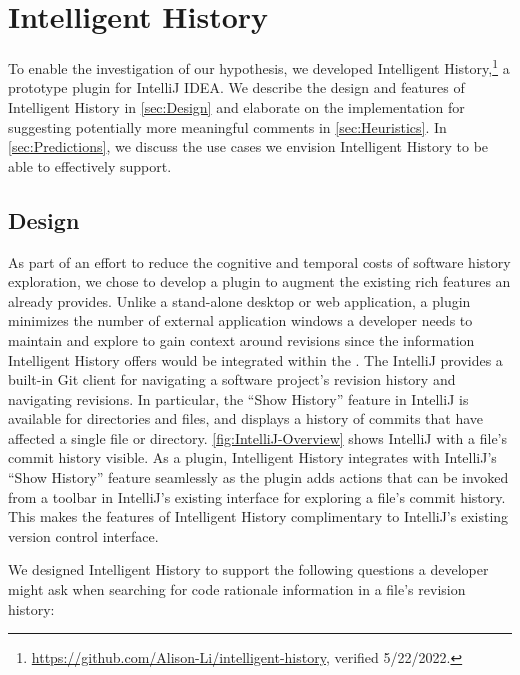 \chapter{Intelligent History}
\label{ch:Intelligent-History}

To enable the investigation of our hypothesis, we developed Intelligent History,\footnote{\url{https://github.com/Alison-Li/intelligent-history}, verified 5/22/2022.} a prototype plugin for IntelliJ IDEA.
We describe the design and features of Intelligent History in \autoref{sec:Design} and elaborate on the implementation
for suggesting potentially more meaningful comments in \autoref{sec:Heuristics}.
In \autoref{sec:Predictions}, we discuss the use cases we envision Intelligent History to be able to effectively support.

\section{Design}
\label{sec:Design}

As part of an effort to reduce the cognitive and temporal costs of software history exploration, we chose to develop a plugin to augment the existing rich features an  already provides.
Unlike a stand-alone desktop or web application, a plugin minimizes the number of external application windows a developer needs to maintain and explore to gain context around revisions since the information Intelligent History offers would be integrated within the .
The IntelliJ  provides a built-in Git client  for navigating a software project's revision history and navigating revisions. 
In particular, the ``Show History'' feature in IntelliJ is available for directories and files, and displays a history of commits that have affected a single file or directory.
\autoref{fig:IntelliJ-Overview} shows IntelliJ with a file's commit history visible.
As a plugin, Intelligent History integrates with IntelliJ's ``Show History'' feature seamlessly as the plugin adds actions that can be invoked from a toolbar in IntelliJ's existing interface for exploring a file's commit history. 
This makes the features of Intelligent History complimentary to IntelliJ's existing version control interface.

We designed Intelligent History to support the following questions a developer might ask when searching for code rationale information in a file's revision history:

